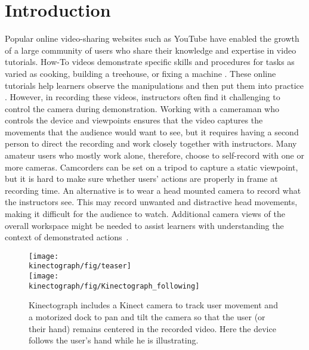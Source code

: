 \section{Introduction}

Popular online video-sharing websites such as YouTube have enabled the growth of a large community of users who share their knowledge and expertise in video tutorials. How-To videos demonstrate specific skills and procedures for tasks as varied as cooking, building a treehouse, or fixing a machine \cite{Torrey:2007he}.
These online tutorials help learners observe the manipulations and then put them into practice \cite{Torrey:2009fc}. However, in recording these videos, instructors often find it challenging to control the camera during demonstration.
%
Working with a cameraman who controls the device and viewpoints ensures that the video captures the movements that the audience would want to see, but it requires having a second person to direct the recording and work closely together with instructors. Many amateur users who mostly work alone, therefore, choose to self-record with one or more cameras. Camcorders can be set on a tripod to capture a static viewpoint, but it is hard to make sure whether users' actions are properly in frame at recording time. An alternative is to wear a head mounted camera to record what the instructors see. This may record unwanted and distractive head movements, making it difficult for the audience to watch. Additional camera views of the overall workspace might be needed to assist learners with understanding the context of demonstrated actions~\cite{Fussell:2003te}.

\begin{figure}[t]
\centering
\texttt{[image: \\kinectograph/fig/teaser]}\\
\texttt{[image: \\kinectograph/fig/Kinectograph\_following]}
\caption{Kinectograph includes a Kinect camera to track user movement and a motorized dock to pan and tilt the camera so that the user (or their hand) remains centered in the recorded video. Here the device follows the user's hand while he is illustrating.}
\label{fig:figure1}
\end{figure}

